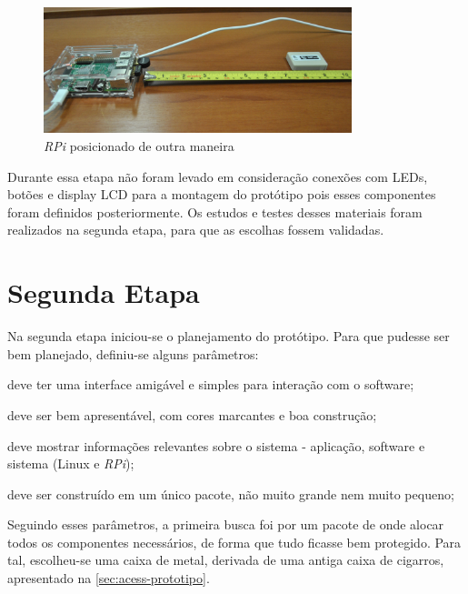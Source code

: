 \documentclass[
		12pt,				%
		openright,			%
		oneside,			%
		a4paper,			%
		chapter=TITLE,		%
		english,			%
		brazil				%
	]{abntex2}
\begin{document}
\begin{figure}[htb]
	\caption{\label{fig:posiciona-rpi}\textit{RPi} posicionado de outra maneira}
	\begin{center}
		\includegraphics[width=0.8\textwidth]{img/ambiente2.jpg}
	\end{center}
\end{figure}

Durante essa etapa não foram levado em consideração conexões com LEDs, botões e display LCD para a montagem do protótipo pois esses componentes foram definidos posteriormente. Os estudos e testes desses materiais foram realizados na segunda etapa, para que as escolhas fossem validadas.

\section{Segunda Etapa}\label{sec:segunda-etapa}

Na segunda etapa iniciou-se o planejamento do protótipo. Para que pudesse ser bem planejado, definiu-se alguns parâmetros:

\begin{alineas}
	\item deve ter uma interface amigável e simples para interação com o software;
	\item deve ser bem apresentável, com cores marcantes e boa construção;
	\item deve mostrar informações relevantes sobre o sistema - aplicação, software e sistema (Linux e \textit{RPi});
	\item deve ser construído em um único pacote, não muito grande nem muito pequeno;
\end{alineas}

Seguindo esses parâmetros, a primeira busca foi por um pacote de onde alocar todos os componentes necessários, de forma que tudo ficasse bem protegido. Para tal, escolheu-se uma caixa de metal, derivada de uma antiga caixa de cigarros, apresentado na \autoref{sec:acess-prototipo}.
\end{document}

